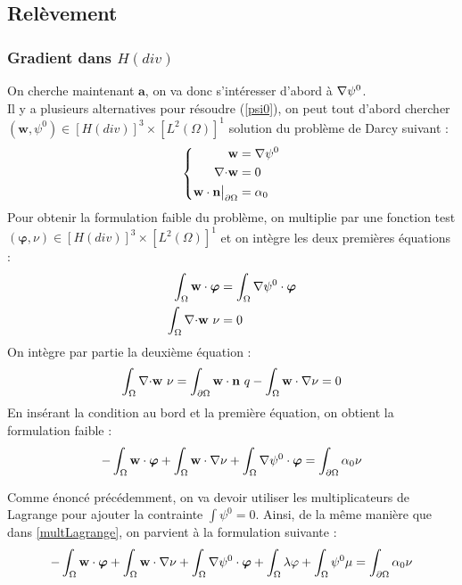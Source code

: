 \subsection{Relèvement}
\label{relev}

\subsubsection{Gradient dans $H(div)$}

On cherche maintenant $\mathbf{a}$, on va donc s'intéresser d'abord à ${\nabla}\psi^0$.\\
Il y a plusieurs alternatives pour résoudre (\ref{psi0}), on peut tout d'abord chercher $(\mathbf{w},\psi^0)\in [H(div)]^3\times [L^2(\Omega)]^1$ solution du problème de Darcy suivant :
\begin{equation}\label{pbpsidiv}
\left\{\begin{aligned}
\mathbf{w} &= {\nabla} \psi^0\\
{\nabla\cdot} \mathbf{w} &= 0\\
\mathbf{w}\cdot \mathbf{n}{\big\rvert_{\partial\Omega}} &= \alpha_0
\end{aligned}\right.
\end{equation}
Pour obtenir la formulation faible du problème, on multiplie par une fonction test $(\bm{\varphi},\nu)\in [H(div)]^3\times [L^2(\Omega)]^1$ et on intègre les deux premières équations :
\begin{align*}
\int_\Omega \mathbf{w}\cdot\bm{\varphi} &= \int_\Omega {\nabla}\psi^0\cdot\bm{\varphi}\\
\int_\Omega {\nabla\cdot} \mathbf{w}\ \nu &= 0
\end{align*}
On intègre par partie la deuxième équation :
\[ \int_\Omega {\nabla\cdot} \mathbf{w}\ \nu = \int_{\partial\Omega} \mathbf{w}\cdot \mathbf{n}\ q - \int_\Omega \mathbf{w}\cdot{\nabla}\nu = 0  \]
En insérant la condition au bord et la première équation, on obtient la formulation faible :
\[ -\int_\Omega \mathbf{w}\cdot\bm{\varphi} + \int_\Omega \mathbf{w}\cdot{\nabla}\nu + \int_\Omega {\nabla}\psi^0\cdot\bm{\varphi}  = \int_{\partial\Omega} \alpha_0\nu \]

Comme énoncé précédemment, on va devoir utiliser les multiplicateurs de Lagrange pour ajouter la contrainte $\int \psi^0=0$. Ainsi, de la même manière que dans \ref{multLagrange}, on parvient à la formulation suivante :
\begin{equation}\label{fvpsidiv}
-\int_\Omega \mathbf{w}\cdot\bm{\varphi} + \int_\Omega \mathbf{w}\cdot{\nabla}\nu + \int_\Omega {\nabla}\psi^0\cdot\bm{\varphi} + \int_\Omega \lambda\varphi + \int_\Omega \psi^0\mu = \int_{\partial\Omega} \alpha_0\nu
\end{equation}

